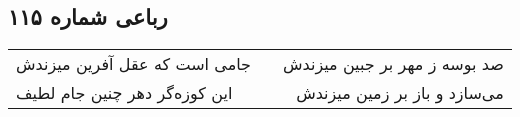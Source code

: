 \begin{center}
\section*{رباعی شماره ۱۱۵}
\label{sec:sh115}
\begin{longtable}{l p{0.5cm} r}
جامی است که عقل آفرین میزندش
&&
صد بوسه ز مهر بر جبین میزندش
\\
این کوزه‌گر دهر چنین جام لطیف
&&
می‌سازد و باز بر زمین میزندش
\\
\end{longtable}
\end{center}
